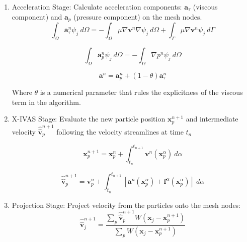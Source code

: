 \documentclass[a4paper,conference]{IEEEtran}
\begin{document}
\begin{enumerate}
  \item Acceleration Stage: Calculate acceleration components: $\mathbf{a}_{\tau}$ (viscous component) and $\mathbf{a}_{p}$ (pressure component) on the mesh nodes.
  \begin{equation}\label{Step1a}
\int_{\Omega}\mathbf{a}^{n}_{\tau}\psi_j\ d\Omega=-\int_{\Omega}\mu \nabla\mathbf{v}^{n} \nabla \psi_j\ d\Omega + \int_{\Gamma}\mu \nabla\mathbf{v}^{n} \psi_j \ d\Gamma
\end{equation}

\begin{equation}\label{Step1b}
\int_{\Omega}\mathbf{a}^{n}_{p}\psi_j\ d\Omega=-\int_{\Omega}\nabla p^{n} \psi_j\ d\Omega
\end{equation}

\begin{equation}\label{Step1c}
\mathbf{a}^{n}=\mathbf{a}^{n}_{p} + (1-\theta)\mathbf{a}^{n}_{\tau}
\end{equation}

Where $\theta$ is a numerical parameter that rules the explicitness of the viscous term in the algorithm.

  \item X-IVAS Stage: Evaluate the new particle position $\mathbf{x}^{n+1}_{p}$ and intermediate velocity $\widehat{\widehat{\mathbf{v}}}^{n+1}_{p}$ following the velocity streamlines at time $t_n$

  \begin{equation}\label{Step2a}
\mathbf{x}^{n+1}_{p}=\mathbf{x}^{n}_{p} + \int_{t_n}^{t_{n+1}} \mathbf{v}^{n}(\mathbf{x}_p^{\alpha}) \ d\alpha
\end{equation}

\begin{equation}\label{Step2b}
\displaystyle \widehat{\widehat{\mathbf{v}}}^{n+1}_{p}=\mathbf{v}^{n}_{p} +
\int_{t_n}^{t_{n+1}} \left[ \mathbf{a}^{n}(\mathbf{x}_p^{\alpha}) + \mathbf{f}^{\alpha} (\mathbf{x}_p^{\alpha}) \right]
 \ d\alpha
\end{equation}

  \item Projection Stage: Project velocity from the particles onto the mesh nodes:
  \begin{equation}\label{Step3a}
\widehat{\widehat{\mathbf{v}}}^{n+1}_{j}=\dfrac{\displaystyle \sum_{p} \widehat{\widehat{\mathbf{v}}}^{n+1}_{p} W(\mathbf{x}_{j}-\mathbf{x}_{p}^{n+1})}{\displaystyle \sum_{p} W(\mathbf{x}_{j}-\mathbf{x}_{p}^{n+1})}
\end{equation}


\end{enumerate}
\end{document}
